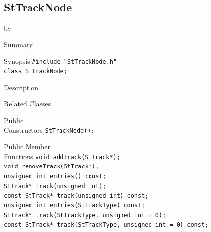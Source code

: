 \documentclass[twoside]{article}
\newcommand{\entrylabel}[1]{\mbox{\textbf{{#1}}}\hfil}%
\newenvironment{entry}
{\begin{list}{}%
    {\renewcommand{\makelabel}{\entrylabel}%
     \setlength{\labelwidth}{90pt}%
     \setlength{\leftmargin}{\labelwidth}
     \advance\leftmargin by \labelsep%
      }%
    }%
  {\end{list}}
\newcommand{\Entrylabel}[1]%
{\raisebox{0pt}[1ex][0pt]{\makebox[\labelwidth][l]%
    {\parbox[t]{\labelwidth}{\hspace{0pt}\textbf{{#1}}}}}}
\newenvironment{Entry}%
{\renewcommand{\entrylabel}{\Entrylabel}\begin{entry}}%
  {\end{entry}}
\begin{document}
\subsection{StTrackNode}
\label{sec:StTrackNode}
\begin{Entry}
\item[Summary]
\item[Synopsis]
    \verb+#include "StTrackNode.h"+\\
    \verb+class StTrackNode;+\\
\item[Description]
\item[Related Classes]
\item[Public\\ Constructors]
    \verb+StTrackNode();+\\
\item[Public Member\\ Functions]
    \verb+void addTrack(StTrack*);+\\
    \verb+void removeTrack(StTrack*);+\\
    \verb+unsigned int entries() const;+\\
    \verb+StTrack* track(unsigned int);+\\
    \verb+const StTrack* track(unsigned int) const;+\\
    \verb+unsigned int entries(StTrackType) const;+\\
    \verb+StTrack* track(StTrackType, unsigned int = 0);+\\
    \verb+const StTrack* track(StTrackType, unsigned int = 0) const;+\\
\end{Entry}
\clearpage
\end{document}

